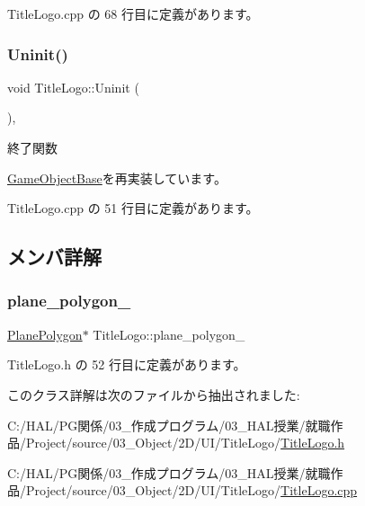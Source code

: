  Title\+Logo.\+cpp の 68 行目に定義があります。

\mbox{\label{class_title_logo_a177943b3becc80fcdb7a34f131b07ee9}} 
\subsubsection{\texorpdfstring{Uninit()}{Uninit()}}
{\footnotesize\ttfamily void Title\+Logo\+::\+Uninit (\begin{DoxyParamCaption}{ }\end{DoxyParamCaption})\hspace{0.3cm}{\ttfamily [override]}, {\ttfamily [virtual]}}



終了関数 



\mbox{\hyperlink{class_game_object_base_a97e1bc277d7b1c0156d4735de29a022c}{Game\+Object\+Base}}を再実装しています。



 Title\+Logo.\+cpp の 51 行目に定義があります。



\subsection{メンバ詳解}
\mbox{\label{class_title_logo_a842ef60ff79632e1dad76599952eb95a}} 
\subsubsection{\texorpdfstring{plane\+\_\+polygon\+\_\+}{plane\_polygon\_}}
{\footnotesize\ttfamily \mbox{\hyperlink{class_plane_polygon}{Plane\+Polygon}}$\ast$ Title\+Logo\+::plane\+\_\+polygon\+\_\+}



 Title\+Logo.\+h の 52 行目に定義があります。



このクラス詳解は次のファイルから抽出されました\+:\begin{DoxyCompactItemize}
\item 
C\+:/\+H\+A\+L/\+P\+G関係/03\+\_\+作成プログラム/03\+\_\+\+H\+A\+L授業/就職作品/\+Project/source/03\+\_\+\+Object/2\+D/\+U\+I/\+Title\+Logo/\mbox{\hyperlink{_title_logo_8h}{Title\+Logo.\+h}}\item 
C\+:/\+H\+A\+L/\+P\+G関係/03\+\_\+作成プログラム/03\+\_\+\+H\+A\+L授業/就職作品/\+Project/source/03\+\_\+\+Object/2\+D/\+U\+I/\+Title\+Logo/\mbox{\hyperlink{_title_logo_8cpp}{Title\+Logo.\+cpp}}\end{DoxyCompactItemize}

